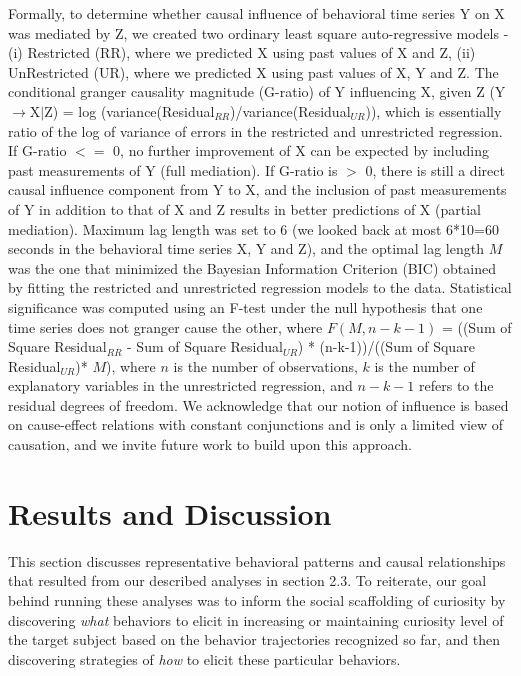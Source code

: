 \documentclass{llncs}
\begin{document}
Formally, to determine whether causal influence of behavioral time series Y on X was mediated by Z, we created two ordinary least square auto-regressive models - (i) Restricted (RR), where we predicted X using past values of X and Z, (ii) UnRestricted (UR), where we predicted X using past values of X, Y and Z. The conditional granger causality magnitude (G-ratio) of Y influencing X, given Z (Y$\rightarrow$X$|$Z) =  log (variance(Residual$_{RR}$)/variance(Residual$_{UR}$)), which is essentially ratio of the log of variance of errors in the restricted and unrestricted regression. If G-ratio $<=$ 0, no further improvement of X can be expected by including past measurements of Y (full mediation). If G-ratio is $>$ 0, there is still a direct causal influence component from Y to X, and the inclusion of past measurements of Y in addition to that of X and Z results in better predictions of X (partial mediation). Maximum lag length was set to 6 (we looked back at most 6*10=60 seconds in the behavioral time series X, Y and Z), and the optimal lag length $M$ was the one that minimized the Bayesian Information Criterion (BIC) obtained by fitting the restricted and unrestricted regression models to the data. Statistical significance was computed using an F-test under the null hypothesis that one time series does not granger cause the other, where $F(M,n-k-1)$ = ((Sum of Square Residual$_{RR}$ - Sum of Square Residual$_{UR}$) * (n-k-1))/((Sum of Square Residual$_{UR}$)* $M$), where $n$ is the number of observations, $k$ is the number of explanatory variables in the unrestricted regression, and $n-k-1$ refers to the residual degrees of freedom. We acknowledge that our notion of influence is based on cause-effect relations with constant conjunctions and is only a limited view of causation, and we invite future work to build upon this approach.
\vspace{-0.5cm}

\section{Results and Discussion}
\vspace{-0.4cm}
This section discusses representative behavioral patterns and causal relationships that resulted from our described analyses in section 2.3. To reiterate, our goal behind running these analyses was to inform the social scaffolding of curiosity by discovering \textit{what} behaviors to elicit in increasing or maintaining curiosity level of the target subject based on the behavior trajectories recognized so far, and then discovering strategies of \textit{how} to elicit these particular behaviors.
\vspace{-0.48cm}
\end{document}
